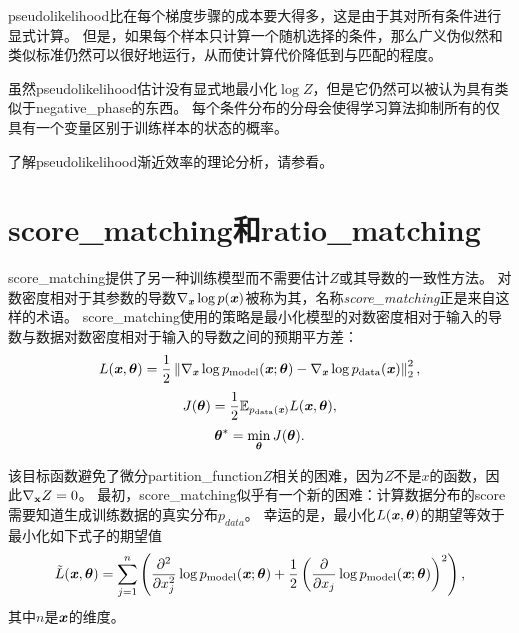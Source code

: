 
\gls{pseudolikelihood}比在每个梯度步骤的成本要大得多，这是由于其对所有条件进行显式计算。
但是，如果每个样本只计算一个随机选择的条件，那么广义伪似然和类似标准仍然可以很好地运行，从而使计算代价降低到与匹配的程度\citep{Goodfellow-et-al-NIPS2013}。


虽然\gls{pseudolikelihood}估计没有显式地最小化$\log Z$，但是它仍然可以被认为具有类似于\gls{negative_phase}的东西。
每个条件分布的分母会使得学习算法抑制所有的仅具有一个变量区别于训练样本的状态的概率。


了解\gls{pseudolikelihood}渐近效率的理论分析，请参看\cite{Marlin11-small}。


\section{\gls{score_matching}和\gls{ratio_matching}}
\label{sec:score_matching_and_ratio_matching}
\gls{score_matching}\citep{Hyvarinen-2005-small}提供了另一种训练模型而不需要估计$Z$或其导数的一致性方法。
对数密度相对于其参数的导数$\nabla_{\boldsymbol{\mathit{x}}} \log p(\boldsymbol{\mathit{x}})$被称为其，名称\emph{\gls{score_matching}}正是来自这样的术语。
\gls{score_matching}使用的策略是最小化模型的对数密度相对于输入的导数与数据对数密度相对于输入的导数之间的预期平方差：
\begin{equation}
	L(\boldsymbol{\mathit{x}}, \boldsymbol{\theta}) = \frac{1}{2} \left\lVert  \nabla_{\boldsymbol{\mathit{x}}} \log p_{\text{model}}(\boldsymbol{\mathit{x}}; \boldsymbol{\theta}) - \nabla_{\boldsymbol{\mathit{x}}} \log p_{\text{data}} (\boldsymbol{\mathit{x}})  \right\rVert_2^2,
\end{equation}
\begin{equation}
	J(\boldsymbol{\theta}) = \frac{1}{2} \mathbb{E}_{p_{\text{data}}(\boldsymbol{\mathit{x}})}  L(\boldsymbol{\mathit{x}}, \boldsymbol{\theta}),
\end{equation}
\begin{equation}
	\boldsymbol{\theta}^* = \min_{\boldsymbol{\theta}} J(\boldsymbol{\theta}) .
\end{equation}


该目标函数避免了微分\gls{partition_function}$Z$相关的困难，因为$Z$不是$x$的函数，因此$\nabla_{\mathbf{x}} Z = 0$。
最初，\gls{score_matching}似乎有一个新的困难：计算数据分布的\gls{score}需要知道生成训练数据的真实分布$p_{data}$。
幸运的是，最小化$L(\boldsymbol{\mathit{x}}, \boldsymbol{\theta})$的期望等效于最小化如下式子的期望值
\begin{equation}
	\tilde{L} (\boldsymbol{\mathit{x}}, \boldsymbol{\theta}) = \sum_{j=1}^n \left( \frac{\partial^2}{ \partial x_j^2 } 
	\log p_{\text{model}} (\boldsymbol{\mathit{x}}; \boldsymbol{\theta}) + \frac{1}{2} \left( \frac{\partial}{ \partial x_j }
	\log p_{\text{model}} (\boldsymbol{\mathit{x}}; \boldsymbol{\theta})
  \right)^2
\right),
\end{equation}
其中$n$是$\boldsymbol{\mathit{x}}$的维度。

